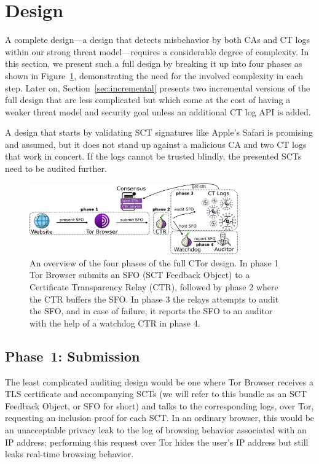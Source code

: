 \section{Design} \label{sec:base}

A complete design---a design that detects misbehavior by both CAs and CT logs
within our strong threat model---requires a considerable degree of
complexity. In this section, we present such a full design by breaking it up
into four phases as shown in Figure~\ref{fig:design}, demonstrating the need for
the involved complexity in each step.  Later on, Section~\ref{sec:incremental}
presents two incremental versions of the full design that are less complicated
but which come at the cost of having a weaker threat model and security goal
unless an additional CT log API is added.

A design that starts by validating SCT signatures like Apple's Safari is
promising and assumed, but it does not stand up against a malicious CA and two
CT logs that work in concert.  If the logs cannot be trusted blindly, the
presented SCTs need to be audited further.

\begin{figure}
    \centering
	\includegraphics[width=0.8\textwidth]{img/design-full}
	\vspace{-8px}
	\caption{%
		An overview of the four phases of the full CTor design. In phase 1 Tor
	Browser submits an SFO (SCT Feedback Object) to a Certificate Transparency
	Relay (CTR), followed by phase 2 where the CTR buffers the SFO. In phase 3
	the relays attempts to audit the SFO, and in case of failure, it reports the
	SFO to an auditor with the help of a watchdog CTR in phase 4.}
	\label{fig:design}
	\vspace{-10px}
\end{figure}

\subsection{Phase~1: Submission} \label{sec:base:phase1}

The least complicated auditing design would be one where Tor Browser receives a
TLS certificate and accompanying SCTs (we will refer to this bundle as an SCT
Feedback Object, or SFO for short) and talks to the corresponding logs, over
Tor, requesting an inclusion proof for each SCT. In an ordinary browser, this
would be an unacceptable privacy leak to the log of browsing behavior associated
with an IP address; performing this request over Tor hides the user's IP address
but still leaks real-time browsing behavior.

